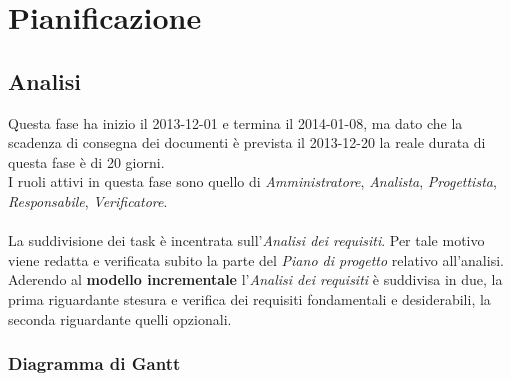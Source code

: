 \section{Pianificazione}

	\subsection{Analisi}

Questa fase ha inizio il 2013-12-01 e termina il 2014-01-08, ma dato che la scadenza di consegna dei documenti è prevista il 2013-12-20 la reale durata di questa fase è di 20 giorni. \\
I ruoli attivi in questa fase sono quello di \textit{Amministratore}, \textit{Analista}, \textit{Progettista}, \textit{Responsabile}, \textit{Verificatore}. \\ \\
La suddivisione dei task è incentrata sull'\textit{Analisi dei requisiti}. Per tale motivo viene redatta e verificata subito la parte del \textit{Piano di progetto} relativo all'analisi.
Aderendo al \textbf{modello incrementale} l'\textit{Analisi dei requisiti} è suddivisa in due, la prima riguardante stesura e verifica dei requisiti fondamentali e desiderabili, la seconda riguardante quelli opzionali.
\subsubsection{Diagramma di Gantt}

